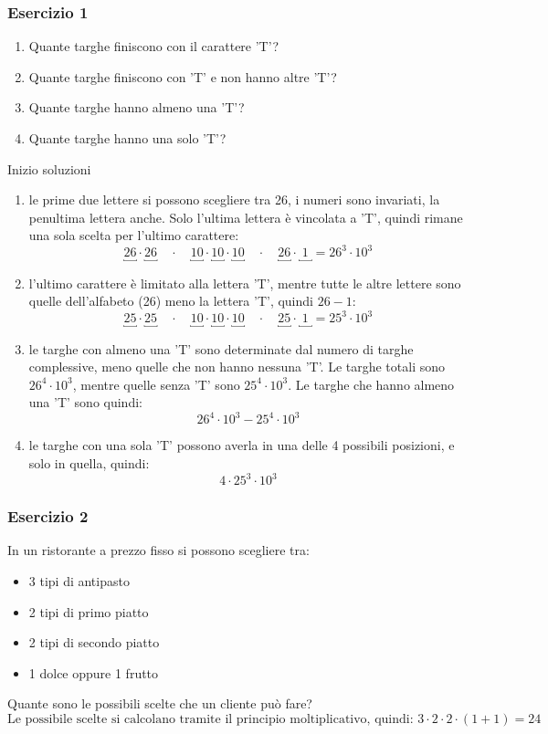 \documentclass[italian]{article}
\begin{document}
\subsubsection{Esercizio 1}
\begin{enumerate}[label=\alph*)]
	\item Quante targhe finiscono con il carattere 'T'?
	\item Quante targhe finiscono con 'T' e non hanno altre 'T'?
	\item Quante targhe hanno almeno una 'T'?
	\item Quante targhe hanno una solo 'T'?
\end{enumerate}
Inizio soluzioni
\begin{enumerate}[label=\alph*)]
	\item le prime due lettere si possono scegliere tra 26, i numeri sono invariati, la penultima lettera anche. Solo l'ultima lettera è vincolata a 'T', quindi rimane una sola scelta per l'ultimo carattere:
	\[\underbracket{26}\cdot \underbracket{26} \quad \cdot \quad \underbracket{10} \cdot \underbracket{10} \cdot \underbracket{10} \quad \cdot \quad \underbracket{26} \cdot \underbracket{\;1\;} = 26^3\cdot 10^3\]
	
	\item l'ultimo carattere è limitato alla lettera 'T', mentre tutte le altre lettere sono quelle dell'alfabeto (26) meno la lettera 'T', quindi $26-1$:
	\[\underbracket{25}\cdot \underbracket{25} \quad \cdot \quad \underbracket{10} \cdot \underbracket{10} \cdot \underbracket{10} \quad \cdot \quad \underbracket{25} \cdot \underbracket{\;1\;} = 25^3\cdot 10^3\]
	
	\item le targhe con almeno una 'T' sono determinate dal numero di targhe complessive, meno quelle che non hanno nessuna 'T'. Le targhe totali sono $26^4\cdot 10^3$, mentre quelle senza 'T' sono $25^4\cdot 10^3$. Le targhe che hanno almeno una 'T' sono quindi:
	\[ 26^4 \cdot 10^3 - 25^4\cdot 10^3 \]
	
	\item le targhe con una sola 'T' possono averla in una delle 4 possibili posizioni, e solo in quella, quindi:
	\[ 4\cdot 25^3 \cdot 10^3 \]
\end{enumerate}

\subsubsection{Esercizio 2}
In un ristorante a prezzo fisso si possono scegliere tra:
\begin{itemize}
	\item 3 tipi di antipasto
	\item 2 tipi di primo piatto
	\item 2 tipi di secondo piatto
	\item 1 dolce oppure 1 frutto
\end{itemize}
Quante sono le possibili scelte che un cliente può fare?
\[
	\text{Le possibile scelte si calcolano tramite il principio moltiplicativo, quindi: }
	3 \cdot 2 \cdot 2 \cdot (1 + 1) = 24
\]
\end{document}
